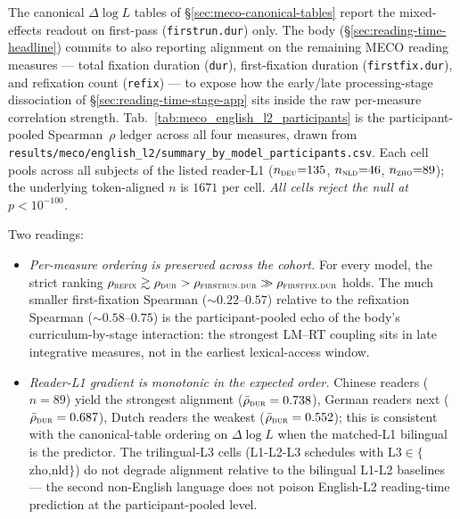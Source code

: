 The canonical $\Delta\log L$ tables of \S\ref{sec:meco-canonical-tables} report the mixed-effects readout on first-pass (\texttt{firstrun.dur}) only. The body (\S\ref{sec:reading-time-headline}) commits to also reporting alignment on the remaining MECO reading measures --- total fixation duration (\texttt{dur}), first-fixation duration (\texttt{firstfix.dur}), and refixation count (\texttt{refix}) --- to expose how the early/late processing-stage dissociation of \S\ref{sec:reading-time-stage-app} sits inside the raw per-measure correlation strength. Tab.~\ref{tab:meco_english_l2_participants} is the participant-pooled Spearman~$\rho$ ledger across all four measures, drawn from \texttt{results/meco/english\_l2/summary\_by\_model\_participants.csv}. Each cell pools across all subjects of the listed reader-L1 ($n_\textsc{deu}{=}135$, $n_\textsc{nld}{=}46$, $n_\textsc{zho}{=}89$); the underlying token-aligned $n$ is $1671$ per cell. \emph{All cells reject the null at $p < 10^{-100}$.}

Two readings:
\begin{itemize}
  \item \emph{Per-measure ordering is preserved across the cohort.} For every model, the strict ranking $\rho_\textsc{refix} \gtrsim \rho_\textsc{dur} > \rho_\textsc{firstrun.dur} \gg \rho_\textsc{firstfix.dur}$ holds. The much smaller first-fixation Spearman ($\sim 0.22$--$0.57$) relative to the refixation Spearman ($\sim 0.58$--$0.75$) is the participant-pooled echo of the body's curriculum-by-stage interaction: the strongest LM--RT coupling sits in late integrative measures, not in the earliest lexical-access window.
  \item \emph{Reader-L1 gradient is monotonic in the expected order.} Chinese readers ($n=89$) yield the strongest alignment ($\bar\rho_\textsc{dur} = 0.738$), German readers next ($\bar\rho_\textsc{dur} = 0.687$), Dutch readers the weakest ($\bar\rho_\textsc{dur} = 0.552$); this is consistent with the canonical-table ordering on $\Delta\log L$ when the matched-L1 \beetle{} bilingual is the predictor. The trilingual-L3 cells (\textsc{L1-L2-L3} schedules with L3$\in\{$zho,nld$\}$) do not degrade alignment relative to the bilingual L1-L2 baselines --- the second non-English language does not poison English-L2 reading-time prediction at the participant-pooled level.
\end{itemize}


